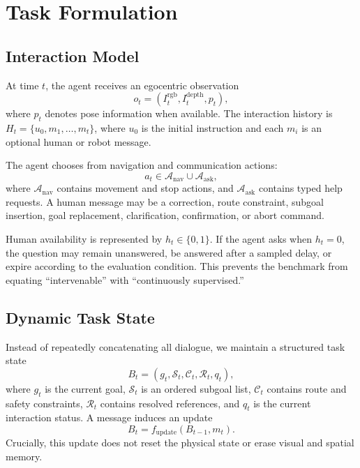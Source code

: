 \documentclass[10pt]{article}
\begin{document}
\section{Task Formulation}
\label{sec:task}

\subsection{Interaction Model}

At time $t$, the agent receives an egocentric observation
\begin{equation}
  o_t = (I_t^{\mathrm{rgb}}, I_t^{\mathrm{depth}}, p_t),
\end{equation}
where $p_t$ denotes pose information when available. The interaction history is
$H_t=\{u_0,m_1,\ldots,m_t\}$, where $u_0$ is the initial instruction and each
$m_i$ is an optional human or robot message.

The agent chooses from navigation and communication actions:
\begin{equation}
  a_t \in \mathcal{A}_{\mathrm{nav}} \cup \mathcal{A}_{\mathrm{ask}},
\end{equation}
where $\mathcal{A}_{\mathrm{nav}}$ contains movement and stop actions, and
$\mathcal{A}_{\mathrm{ask}}$ contains typed help requests. A human message may
be a correction, route constraint, subgoal insertion, goal replacement,
clarification, confirmation, or abort command.

Human availability is represented by $h_t\in\{0,1\}$. If the agent asks when
$h_t=0$, the question may remain unanswered, be answered after a sampled
delay, or expire according to the evaluation condition. This prevents the
benchmark from equating ``intervenable'' with ``continuously supervised.''

\subsection{Dynamic Task State}

Instead of repeatedly concatenating all dialogue, we maintain a structured
task state
\begin{equation}
  B_t=(g_t,\mathcal{S}_t,\mathcal{C}_t,\mathcal{R}_t,q_t),
\end{equation}
where $g_t$ is the current goal, $\mathcal{S}_t$ is an ordered subgoal list,
$\mathcal{C}_t$ contains route and safety constraints, $\mathcal{R}_t$
contains resolved references, and $q_t$ is the current interaction status.
A message induces an update
\begin{equation}
  B_t=f_{\mathrm{update}}(B_{t-1},m_t).
\end{equation}
Crucially, this update does not reset the physical state or erase visual and
spatial memory.
\end{document}
